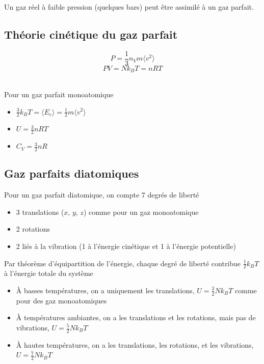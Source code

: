 \documentclass[openany]{book}
\begin{document}
\noindent Un gaz réel à faible pression (quelques bars) peut être assimilé à un gaz parfait. 

\subsection{Théorie cinétique du gaz parfait}
\[ P = \frac{1}{3}n_Vm \langle v^2 \rangle \]
\[ PV = Nk_B T = nRT \]

\noindent [Démonstration - c.f. T1-2] \\

\noindent Pour un gaz parfait monoatomique

\begin{itemize}
    \item $\frac{3}{2}k_B T =  \langle E_c \rangle = \frac{1}{2}m \langle v^2 \rangle$
    \item $U = \frac{3}{2}nRT$
    \item $C_V = \frac{3}{2}nR$
\end{itemize}

\subsection{Gaz parfaits diatomiques}

Pour un gaz parfait diatomique, on compte 7 degrés de liberté
\begin{itemize}
    \item 3 translations ($x$, $y$, $z$) comme pour un gaz monoatomique
    \item 2 rotations 
    \item 2 liés à la vibration (1 à l'énergie cinétique et 1 à l'énergie potentielle)
\end{itemize}

\noindent Par théorème d'équipartition de l'énergie, chaque degré de liberté contribue $\frac{1}{2}k_BT$ à l'énergie totale du système
\begin{itemize}
    \item À basses températures, on a uniquement les translations, $U = \frac{3}{2}N k_BT$ comme pour des gaz monoatomiques
    \item À températures ambiantes, on a les translations et les rotations, mais pas de vibrations, $U = \frac{5}{2} N k_BT$
    \item À hautes températures, on a les translations, les rotations, et les vibrations, $U = \frac{7}{2} N k_BT$
\end{itemize}
\end{document}
